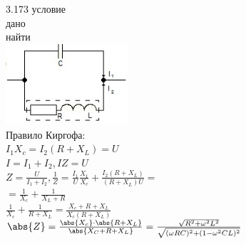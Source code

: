 \testCom
{%
	3.173
}
{%
	условие\\
}
{%
	дано\\
}
{%
	найти\\
}
{%
	\includegraphics[height=30mm]{3_173.jpg}\\
	Правило Киргофа:\\
	$I_1 X_c = I_2 (R + X_L) = U$\\
	$I = I_1 + I_2, I Z = U$\\
	$Z= \frac{U}{I_1 + I_2}, \frac{1}{Z} = \frac{I_1}{U} \frac{X_1}{X_c} + \frac{I_2 (R + X_L)}{(R + X_L) U} =$\\
	$= \frac{1}{X_c} + \frac{1}{X_L + R}$\\
	$\frac{1}{X_c} + \frac{1}{R + X_L} = \frac{X_c + R + X_L}{X_c (R + X_L)}$\\
	$\abs{Z} = \frac{\abs{X_c} \cdot \abs{R + X_L}}{\abs{X_C + R + X_L}} = \frac{\sqrt{R^2 + \omega^2 L^2}}{\sqrt{(\omega R C)^2 + (1 - \omega^2 C L)^2}}$\\
	
}

